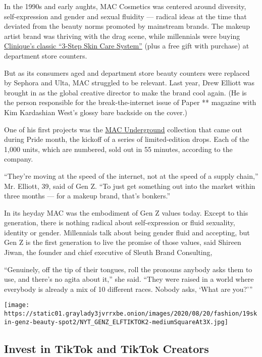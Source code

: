 In the 1990s and early aughts, MAC Cosmetics was centered around
diversity, self-expression and gender and sexual fluidity --- radical
ideas at the time that deviated from the beauty norms promoted by
mainstream brands. The makeup artist brand was thriving with the drag
scene, while millennials were buying
\href{https://www.clinique.com/thewink/cult-classic/3-step-skin-care-system}{Clinique's
classic ``3-Step Skin Care System''} (plus a free gift with purchase) at
department store counters.

But as its consumers aged and department store beauty counters were
replaced by Sephora and Ulta, MAC struggled to be relevant. Last year,
Drew Elliott was brought in as the global creative director to make the
brand cool again. (He is the person responsible for the
break-the-internet issue of Paper ** magazine with Kim Kardashian West's
glossy bare backside on the cover.)

One of his first projects was the
\href{https://www.maccosmetics.com/mac-underground}{MAC Underground}
collection that came out during Pride month, the kickoff of a series of
limited-edition drops. Each of the 1,000 units, which are numbered, sold
out in 55 minutes, according to the company.

``They're moving at the speed of the internet, not at the speed of a
supply chain,'' Mr. Elliott, 39, said of Gen Z. ``To just get something
out into the market within three months --- for a makeup brand, that's
bonkers.''

In its heyday MAC was the embodiment of Gen Z values today. Except to
this generation, there is nothing radical about self-expression or fluid
sexuality, identity or gender. Millennials talk about being gender fluid
and accepting, but Gen Z is the first generation to live the promise of
those values, said Shireen Jiwan, the founder and chief executive of
Sleuth Brand Consulting,

``Genuinely, off the tip of their tongues, roll the pronouns anybody
asks them to use, and there's no agita about it,'' she said. ``They were
raised in a world where everybody is already a mix of 10 different
races. Nobody asks, `What are you?'''

\texttt{[image: https://static01.graylady3jvrrxbe.onion/images/2020/08/20/fashion/19skin-genz-beauty-spot2/NYT\_GENZ\_ELFTIKTOK2-mediumSquareAt3X.jpg]}

\hypertarget{invest-in-tiktok-and-tiktok-creators}{%
\subsection{Invest in TikTok and TikTok
Creators}\label{invest-in-tiktok-and-tiktok-creators}}

